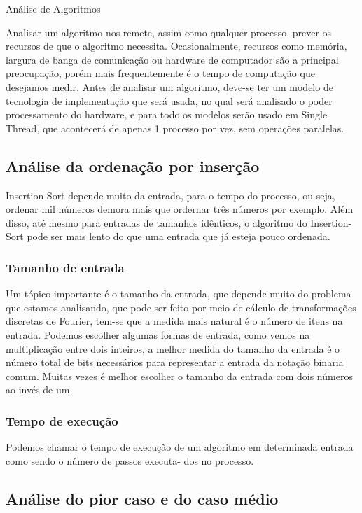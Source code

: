 Análise de Algoritmos

Analisar um algoritmo nos remete, assim como qualquer processo, prever os recursos de que o algoritmo necessita. 
Ocasionalmente, recursos como memória, largura de banga de comunicação ou hardware de computador são a principal 
preocupação, porém mais frequentemente é o tempo de computação que desejamos medir. 
Antes de analisar um algoritmo, deve-se ter um modelo de tecnologia de implementação que será usada, no qual será
analisado o poder processamento do hardware, e para todo os modelos serão usado em Single Thread, que acontecerá
de apenas 1 processo por vez, sem operações paralelas.

\subsection{Análise da ordenação por inserção}

Insertion-Sort depende muito da entrada, para o tempo do processo, ou seja, ordenar mil números demora mais que 
ordernar três números por exemplo. Além disso, até mesmo para entradas de tamanhos idênticos, o algoritmo do 
Insertion-Sort pode ser mais lento do que uma entrada que já esteja pouco ordenada.

\subsubsection{Tamanho de entrada}

Um tópico importante é o tamanho da entrada, que depende muito do problema que estamos analisando, que pode ser
feito por meio de cálculo de transformações discretas de Fourier, tem-se que a medida mais natural é o número de
itens na entrada. Podemos escolher algumas formas de entrada, como vemos  na multiplicação entre dois inteiros,
a melhor medida do tamanho da entrada é o número total de bits necessários para representar a entrada da notação
binaria comum. Muitas vezes é melhor escolher o tamanho da entrada com dois números ao invés de um.

\subsubsection{Tempo de execução}

Podemos chamar o tempo de execução de um algoritmo em determinada entrada como sendo o número de passos executa-
dos no processo.

\subsection{Análise do pior caso e do caso médio}

